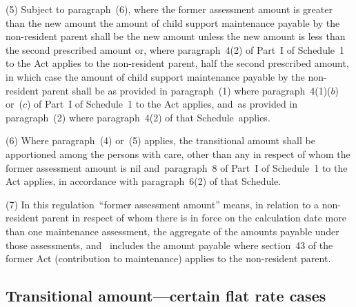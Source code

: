 \documentclass[12pt,a4paper]{article}
\begin{document}
(5) Subject to paragraph~(6), where the former assessment amount is greater than the new amount the amount of child support maintenance payable by the non-resident parent shall be the new amount unless the new amount is less than the second prescribed amount or, where paragraph~4(2) of Part~I of Schedule~1 to the Act applies to the non-resident parent, half the second prescribed amount, in which case the amount of child support maintenance payable by the non-resident parent shall be as provided in paragraph~(1) where paragraph~4(1)($b$)  
or~($c$)  %
of Part~I of Schedule~1 to the Act applies, and~as provided in paragraph~(2) where paragraph~4(2) of that Schedule~applies.


(6) Where paragraph~(4) or~(5) applies, the transitional amount shall be apportioned among the persons with care, other than any in respect of whom the former assessment amount is nil and~paragraph~8 of Part~I of Schedule~1 to the Act applies, in accordance with paragraph~6(2) of that Schedule.

(7) In this regulation~“former assessment amount” means, in relation to a non-resident parent in respect of whom there is in force on the calculation date more than one maintenance assessment, the aggregate of the amounts payable under those assessments, and~
includes the amount payable where section~43 of the former Act (contribution to maintenance) applies to the non-resident parent.


\subsection[13. Transitional amount—certain flat rate cases]{Transitional amount—certain flat rate cases}
\end{document}
